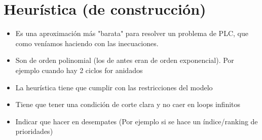 \documentclass[titlepage,a4paper]{article}
\begin{document}
\vspace{1cm}

\section{Heurística (de construcción)}

\begin{itemize}
    \item Es una aproximación más "barata" para resolver un problema de PLC, que como veníamos haciendo con las inecuaciones.
    \item Son de orden polinomial (los de antes eran de orden exponencial). Por ejemplo cuando hay 2 ciclos for anidados 
    \item La heurística tiene que cumplir con las restricciones del modelo
    \item Tiene que tener una condición de corte clara y no caer en loops infinitos
    \item Indicar que hacer en desempates (Por ejemplo si se hace un índice/ranking de prioridades)
\end{itemize}
 
\end{document}
